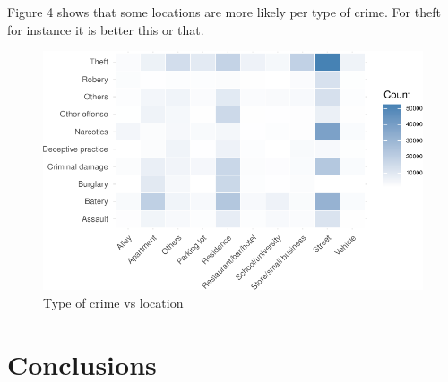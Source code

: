 \documentclass[]{article}
\begin{document}
Figure 4 shows that some locations are more likely per type of crime.
For theft for instance it is better this or that.

\begin{figure}[H]

{\centering \includegraphics{Assessment_1v12_files/figure-latex/fig11-1} 

}

\caption{Type of crime vs location}\label{fig:fig11}
\end{figure}

\section{Conclusions}\label{conclusions}
\end{document}

